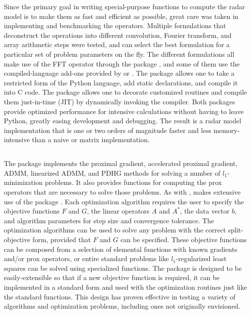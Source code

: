Since the primary goal in writing special-purpose functions to compute the radar model is to make them as fast and efficient as possible, great care was taken in implementing and benchmarking the operators. Multiple formulations that deconstruct the operations into different convolution, Fourier transform, and array arithmetic steps were tested, and  can select the best formulation for a particular set of problem parameters on the fly. The different formulations all make use of the FFT operator through the  package \autocite{pyfftw}, and some of them use the compiled-language add-ons provided by  or . The  package \autocite{cython} allows one to take a restricted form of the Python language, add static declarations, and compile it into C code. The  package \autocite{numba} allows one to decorate customized  routines and compile them just-in-time (JIT) by dynamically invoking the  compiler. Both packages provide optimized performance for intensive calculations without having to leave Python, greatly easing development and debugging. The result is a radar model implementation that is one or two orders of magnitude faster and less memory-intensive than a naive or matrix implementation.

\subsection{}
The  package implements the proximal gradient, accelerated proximal gradient, ADMM, linearized ADMM, and PDHG methods for solving a number of $l_1$-minimization problems. It also provides functions for computing the prox operators that are necessary to solve those problems. As with ,  makes extensive use of the  package \autocite{numpy}. Each optimization algorithm requires the user to specify the objective functions $F$ and $G$, the linear operators $A$ and $A^*$, the data vector $b$, and algorithm parameters for step size and convergence tolerance. The optimization algorithms can be used to solve any problem with the correct split-objective form, provided that $F$ and $G$ can be specified. These objective functions can be composed from a selection of elemental functions with known gradients and/or prox operators, or entire standard problems like $l_1$-regularized least squares can be solved using specialized functions. The package is designed to be easily-extensible so that if a new objective function is required, it can be implemented in a standard form and used with the optimization routines just like the standard functions. This design has proven effective in testing a variety of algorithms and optimization problems, including ones not originally envisioned.


